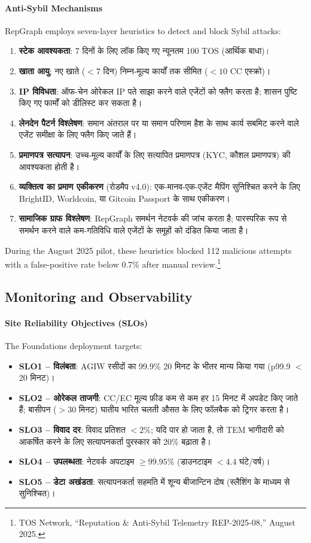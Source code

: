 \documentclass[11pt]{article}
\begin{document}
\paragraph{Anti-Sybil Mechanisms} RepGraph employs seven-layer heuristics to detect and block Sybil attacks:
\begin{enumerate}[noitemsep]
  \item \textbf{स्टेक आवश्यकता}: 7 दिनों के लिए लॉक किए गए न्यूनतम 100 TOS (आर्थिक बाधा)।
  \item \textbf{खाता आयु}: नए खाते ($<7$ दिन) निम्न-मूल्य कार्यों तक सीमित ($<10$ CC एस्क्रो)।
  \item \textbf{IP विविधता}: ऑफ-चेन ओरेकल IP पते साझा करने वाले एजेंटों को फ्लैग करता है; शासन पुष्टि किए गए फार्मों को डीलिस्ट कर सकता है।
  \item \textbf{लेनदेन पैटर्न विश्लेषण}: समान अंतराल पर या समान परिणाम हैश के साथ कार्य सबमिट करने वाले एजेंट समीक्षा के लिए फ्लैग किए जाते हैं।
  \item \textbf{प्रमाणपत्र सत्यापन}: उच्च-मूल्य कार्यों के लिए सत्यापित प्रमाणपत्र (KYC, कौशल प्रमाणपत्र) की आवश्यकता होती है।
  \item \textbf{व्यक्तित्व का प्रमाण एकीकरण} (रोडमैप v4.0): एक-मानव-एक-एजेंट मैपिंग सुनिश्चित करने के लिए BrightID, Worldcoin, या Gitcoin Passport के साथ एकीकरण।
  \item \textbf{सामाजिक ग्राफ विश्लेषण}: RepGraph समर्थन नेटवर्क की जांच करता है; पारस्परिक रूप से समर्थन करने वाले कम-गतिविधि वाले एजेंटों के समूहों को दंडित किया जाता है।
\end{enumerate}
During the August 2025 pilot, these heuristics blocked 112 malicious attempts with a false-positive rate below 0.7\% after manual review.\footnote{TOS Network, ``Reputation \& Anti-Sybil Telemetry REP-2025-08,'' August 2025.}

\subsection{Monitoring and Observability}
\paragraph{Site Reliability Objectives (SLOs)} The Foundations deployment targets:
\begin{itemize}[noitemsep]
  \item \textbf{SLO1 -- विलंबता}: AGIW रसीदों का 99.9\% 20 मिनट के भीतर मान्य किया गया (p99.9 $<$ 20 मिनट)।
  \item \textbf{SLO2 -- ओरेकल ताजगी}: CC/EC मूल्य फ़ीड कम से कम हर 15 मिनट में अपडेट किए जाते हैं; बासीपन ($>30$ मिनट) घातीय भारित चलती औसत के लिए फॉलबैक को ट्रिगर करता है।
  \item \textbf{SLO3 -- विवाद दर}: विवाद प्रतिशत $<2\%$; यदि पार हो जाता है, तो TEM भागीदारी को आकर्षित करने के लिए सत्यापनकर्ता पुरस्कार को 20\% बढ़ाता है।
  \item \textbf{SLO4 -- उपलब्धता}: नेटवर्क अपटाइम $\geq 99.95\%$ (डाउनटाइम $<4.4$ घंटे/वर्ष)।
  \item \textbf{SLO5 -- डेटा अखंडता}: सत्यापनकर्ता सहमति में शून्य बीजान्टिन दोष (स्लैशिंग के माध्यम से सुनिश्चित)।
\end{itemize}
\end{document}
